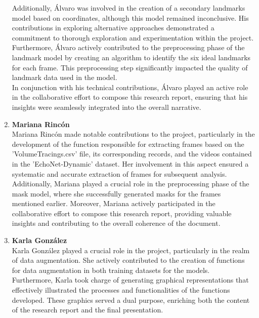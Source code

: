 \documentclass[runningheads]{llncs}
\begin{document}
\begin{enumerate}
    Additionally, Álvaro was involved in the creation of a secondary landmarks model based on coordinates, although this model remained inconclusive. His contributions in exploring alternative approaches demonstrated a commitment to thorough exploration and experimentation within the project.\\
    
    Furthermore, Álvaro actively contributed to the preprocessing phase of the landmark model by creating an algorithm to identify the six ideal landmarks for each frame. This preprocessing step significantly impacted the quality of landmark data used in the model.\\
    
    In conjunction with his technical contributions, Álvaro played an active role in the collaborative effort to compose this research report, ensuring that his insights were seamlessly integrated into the overall narrative.\\
    
    \item \textbf{Mariana Rincón}\\
    
    Mariana Rincón made notable contributions to the project, particularly in the development of the function responsible for extracting frames based on the 'VolumeTracings.csv' file, its corresponding records, and the videos contained in the 'EchoNet-Dynamic' dataset. Her involvement in this aspect ensured a systematic and accurate extraction of frames for subsequent analysis.\\
    
    Additionally, Mariana played a crucial role in the preprocessing phase of the mask model, where she successfully generated masks for the frames mentioned earlier. Moreover, Mariana actively participated in the collaborative effort to compose this research report, providing valuable insights and contributing to the overall coherence of the document.\\
    
    \item \textbf{Karla González}\\
    Karla González played a crucial role in the project, particularly in the realm of data augmentation. She actively contributed to the creation of functions for data augmentation in both training datasets for the models.\\
    
    Furthermore, Karla took charge of generating graphical representations that effectively illustrated the processes and functionalities of the functions developed. These graphics served a dual purpose, enriching both the content of the research report and the final presentation.\\


\end{enumerate}
\end{document}
